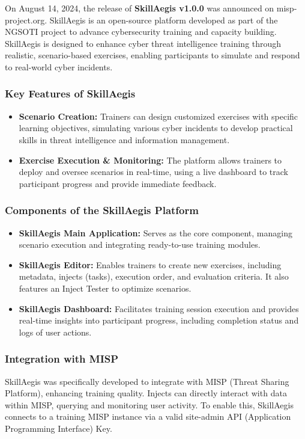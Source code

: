 On August 14, 2024, the release of \textbf{SkillAegis v1.0.0} was announced on misp-project.org. SkillAegis is an open-source platform developed as part of the NGSOTI project to advance cybersecurity training and capacity building. SkillAegis is designed to enhance cyber threat intelligence training through realistic, scenario-based exercises, enabling participants to simulate and respond to real-world cyber incidents.

\subsubsection{Key Features of SkillAegis}
\begin{itemize}
	\item \textbf{Scenario Creation:} Trainers can design customized exercises with specific learning objectives, simulating various cyber incidents to develop practical skills in threat intelligence and information management.
	\item \textbf{Exercise Execution \& Monitoring:} The platform allows trainers to deploy and oversee scenarios in real-time, using a live dashboard to track participant progress and provide immediate feedback.
\end{itemize}

\subsubsection{Components of the SkillAegis Platform}
\begin{itemize}
	\item \textbf{SkillAegis Main Application:} Serves as the core component, managing scenario execution and integrating ready-to-use training modules.
	\item \textbf{SkillAegis Editor:} Enables trainers to create new exercises, including metadata, injects (tasks), execution order, and evaluation criteria. It also features an Inject Tester to optimize scenarios.
	\item \textbf{SkillAegis Dashboard:} Facilitates training session execution and provides real-time insights into participant progress, including completion status and logs of user actions.
\end{itemize}

\subsubsection{Integration with MISP}
SkillAegis was specifically developed to integrate with MISP (Threat Sharing Platform), enhancing training quality. Injects can directly interact with data within MISP, querying and monitoring user activity. To enable this, SkillAegis connects to a training MISP instance via a valid site-admin API (Application Programming Interface) Key.

